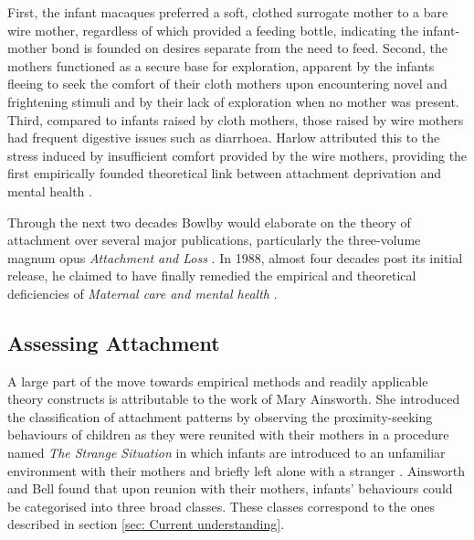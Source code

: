 \documentclass[12pt]{report}
\begin{document}
First, the infant macaques preferred a soft, clothed surrogate mother to a bare wire mother, regardless of which provided a feeding bottle, indicating the infant-mother bond is founded on desires separate from the need to feed.
Second, the mothers functioned as a secure base for exploration, apparent by the infants fleeing to seek the comfort of their cloth mothers upon encountering novel and frightening stimuli and by their lack of exploration when no mother was present.
Third, compared to infants raised by cloth mothers, those raised by wire mothers had frequent digestive issues such as diarrhoea.
Harlow attributed this to the stress induced by insufficient comfort provided by the wire mothers, providing the first empirically founded theoretical link between attachment deprivation and mental health \cite{Harlow1958}.

Through the next two decades Bowlby would elaborate on the theory of attachment over several major publications, particularly the three-volume magnum opus \textit{Attachment and Loss} \cite{Bowlby1969attachment, Bowlby1973separation,Bowlby1980loss}.
In 1988, almost four decades post its initial release, he claimed to have finally remedied the empirical and theoretical deficiencies of \textit{Maternal care and mental health} \cite{Bowlby1988}.

\subsection{Assessing Attachment}
A large part of the move towards empirical methods and readily applicable theory constructs is attributable to the work of Mary Ainsworth.
She introduced the classification of attachment patterns by observing the proximity-seeking behaviours of children as they were reunited with their mothers in a procedure named \textit{The Strange Situation} in which infants are introduced to an unfamiliar environment with their mothers and briefly left alone with a stranger \cite{Ainsworth1979, Ainsworth1970}.
Ainsworth and Bell found that upon reunion with their mothers, infants' behaviours could be categorised into three broad classes.
These classes correspond to the ones described in section \ref{sec: Current understanding}.
\end{document}
